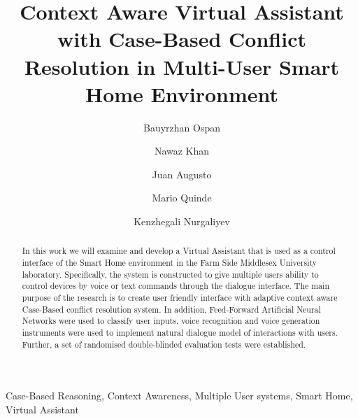 \documentclass{llncs}
\begin{document}
    \title{Context Aware Virtual Assistant with
    Case-Based Conflict Resolution in
    Multi-User Smart Home Environment}
    \author{Bauyrzhan Ospan \and Nawaz Khan  \and Juan Augusto  \and Mario Quinde   \and Kenzhegali Nurgaliyev }
    \maketitle
    \begin{abstract}
        In this work we will examine and develop a Virtual Assistant that is used as a control
        interface of the Smart Home environment in the Farm Side Middlesex University laboratory.
        Specifically, the system is
        constructed to give multiple users ability to control devices by voice or text commands through the dialogue
        interface.
        The main purpose of the research is to create user friendly interface with adaptive context aware
        Case-Based conflict resolution system.
        In addition, Feed-Forward Artificial Neural Networks were used to classify user inputs, voice
        recognition and voice generation instruments were used to implement natural dialogue model of interactions with users.
        Further, a set of randomised double-blinded
        evaluation tests were established.
    \end{abstract}
    \begin{keywords}
        Case-Based Reasoning, Context Awareness, Multiple User systems, Smart Home, Virtual Assistant
    \end{keywords}
\end{document}
